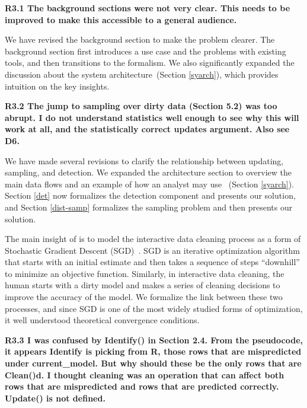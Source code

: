 \noindent\textbf{R3.1 The background sections were not very clear. This needs to be improved
to make this accessible to a general audience.}

\noindent  We have revised the background section to make the problem clearer. The background section first introduces a use case and the problems with existing tools, and then transitions to the formalism. We also significantly expanded the discussion about the system architecture~(Section \ref{syarch}), which provides intuition on the key insights.

\vspace{0.5em}

\noindent\textbf{R3.2 The jump to sampling over dirty data (Section 5.2) was too abrupt.
I do not understand statistics well enough to see why this will work at all,
and the statistically correct updates argument. Also see D6.}

\noindent  We have made several revisions to clarify the relationship between updating, sampling, and detection. We expanded the architecture section to overview the main data flows and an example of how an analyst may use \sys~(Section \ref{syarch}). Section \ref{det} now formalizes the detection component and presents our solution, and Section \ref{dist-samp} formalizes the sampling problem and then presents our solution.

The main insight of \sys is to model the interactive data cleaning process as a form of Stochastic Gradient Descent (SGD)~\cite{bottou2012stochastic}.
SGD is an iterative optimization algorithm that starts with an initial estimate and then takes a sequence of steps ``downhill'' to minimize an objective function.
Similarly, in interactive data cleaning, the human starts with a dirty model and makes a series of cleaning decisions to improve the accuracy of the model.
We formalize the link between these two processes, and since SGD is one of the most widely studied forms of optimization, it well understood theoretical convergence conditions.


\vspace{0.5em}

\noindent \textbf{R3.3 I was confused by Identify() in Section 2.4.
From the pseudocode, it appears Identify is picking from R,
those rows that are mispredicted under current\_model.
But why should these be the only rows that are Clean()d.
I thought cleaning was an operation that can
affect both rows that are mispredicted and rows that
are predicted correctly. Update() is not defined.}

